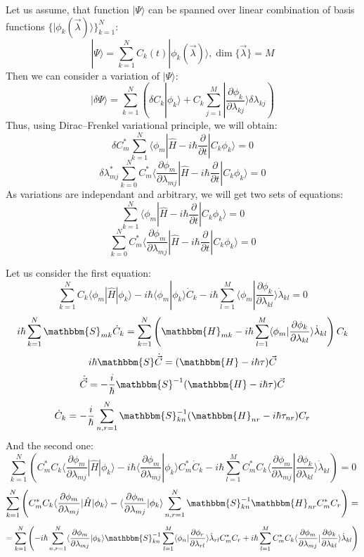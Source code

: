 Let us assume, that function $|\Psi\rangle$ can be spanned over linear combination of basis functions $\{|\phi_k(\vec{\lambda})\rangle\}_{k=1}^N$:
$$|\Psi\rangle = \sum_{k=1}^NC_k(t)|\phi_k(\vec{\lambda})\rangle, \dim\{\vec{\lambda}\} = M$$
Then we can consider a variation of $|\Psi\rangle$:
$$|\delta\Psi\rangle = \sum_{k=1}^N \left( \delta C_k|\phi_k\rangle + %
					   C_k\sum_{j=1}^M|\frac{\partial\phi_k}{\partial\lambda_{kj}}\rangle\delta\lambda_{kj} \right)$$
Thus, using Dirac--Frenkel variational principle, we will obtain:
$$\delta C_m^*\sum_{k=1}^N\langle\phi_m|\hat{H}-i\hbar\frac{\partial}{\partial t}|C_k\phi_k\rangle=0$$
$$\delta\lambda_{mj}^*\sum_{k=0}^NC_m^*\langle\frac{\partial\phi_m}{\partial\lambda_{mj}}|\hat{H}-i\hbar\frac{\partial}{\partial t}|C_k\phi_k\rangle = 0$$
As variations are independant and arbitrary, we will get two sets of equations:
$$\sum_{k=1}^N\langle\phi_m|\hat{H}-i\hbar\frac{\partial}{\partial t}|C_k\phi_k\rangle=0$$
$$\sum_{k=0}^NC_m^*\langle\frac{\partial\phi_m}{\partial\lambda_{mj}}|\hat{H}-i\hbar\frac{\partial}{\partial t}|C_k\phi_k\rangle = 0$$

Let us consider the first equation:
$$\sum_{k=1}^N C_k\langle\phi_m|\hat{H}|\phi_k\rangle - %
	       i\hbar\langle\phi_m|\phi_k\rangle \dot{C}_k - %
	       i\hbar\sum_{l=1}^M\langle\phi_m|\frac{\partial\phi_k}{\partial\lambda_{kl}}\rangle\dot{\lambda}_{kl}=0$$
$$i\hbar\sum_{k=1}^N\mathbbm{S}_{mk}\dot{C}_k=\sum_{k=1}^N\left(\mathbbm{H}_{mk}-%
							  i\hbar\sum_{l=1}^M\langle\phi_m|\frac{\partial\phi_k}{\partial\lambda_{kl}}\rangle\dot{\lambda}_{kl}\right)C_k$$
$$i\hbar\mathbbm{S}\dot{\vec{C}}=(\mathbbm{H}-i\hbar\tau)\vec{C}$$
$$\dot{\vec{C}} = -\frac{i}{\hbar}\mathbbm{S}^{-1}(\mathbbm{H}-i\hbar\tau)\vec{C}$$
$$\dot{C}_k = -\frac{i}{\hbar}\sum_{n,r=1}^N \mathbbm{S}^{-1}_{kn}(\mathbbm{H}_{nr}-i\hbar\tau_{nr})C_r$$
And the second one:
$$\sum_{k=1}^N\left(C_m^*C_k\langle\frac{\partial\phi_m}{\partial\lambda_{mj}}|\hat{H}|\phi_k\rangle-%
	     i\hbar\langle\frac{\partial\phi_m}{\partial\lambda_{mj}}|\phi_k\rangle C_m^*\dot{C}_k-%
	     i\hbar\sum_{l=1}^MC_m^*C_k\langle\frac{\partial\phi_m}{\partial\lambda_{mj}}|\frac{\partial\phi_k}{\partial\lambda_{kl}}\rangle\dot{\lambda}_{kl}\right)=0$$
$$\sum_{k=1}^N\left(C_m^*C_k\langle\frac{\partial\phi_m}{\partial\lambda_{mj}}|\hat{H}|\phi_k\rangle-%
		    \langle\frac{\partial\phi_m}{\partial\lambda_{mj}}|\phi_k\rangle\sum_{n,r=1}^N\mathbbm{S}^{-1}_{kn}\mathbbm{H}_{nr}C_m^*C_r\right)=$$
$$= \sum_{k=1}^N\left(-i\hbar\sum_{n,r=1}^N\langle\frac{\partial\phi_m}{\partial\lambda_{mj}}|\phi_k\rangle\mathbbm{S}_{kn}^{-1}%
		             \sum_{l=1}^M\langle\phi_n|\frac{\partial\phi_r}{\partial\lambda_{rl}}\rangle\dot{\lambda}_{rl}C_m^*C_r+%
     		       i\hbar\sum_{l=1}^MC_m^*C_k\langle\frac{\partial\phi_m}{\partial\lambda_{mj}}|\frac{\partial\phi_k}{\partial\lambda_{kl}}\rangle\dot{\lambda}_{kl}\right)$$

